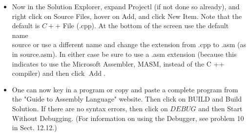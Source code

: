 \documentclass[10pt]{book}
\begin{document}
\begin{center}
\begin{center}
\begin{center}
\begin{center}
\begin{center}
\begin{itemize}
  \item Now in the Solution Explorer, expand Projectl (if not done so already), and right click on Source Files, hover on Add, and click New Item. Note that the default is $C++$ File (.cpp). At the bottom of the screen use the default name\\
source or use a different name and change the extension from .cpp to .asm (as in source.asm). In either case be sure to use a .asm extension (because this indicates to use the Microsoft Assembler, MASM, instead of the C ++ compiler) and then click $\operatorname{Add}$.
  \item One can now key in a program or copy and paste a complete program from the "Guide to Assembly Language" website. Then click on BUILD and Build Solution. If there are no syntax errors, then click on $D E B U G$ and then Start Without Debugging. (For information on using the Debugger, see problem 10 in Sect. 12.12.)
\end{itemize}


\end{center}
\end{center}
\end{center}
\end{center}
\end{center}
\end{document}
